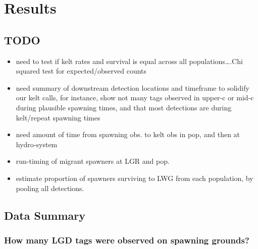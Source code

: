 \documentclass[11pt,a4paper,]{article}
\providecommand{\tightlist}{%
  \setlength{\itemsep}{0pt}\setlength{\parskip}{0pt}}
\begin{document}
\hypertarget{results}{%
\section{Results}\label{results}}

\hypertarget{todo}{%
\subsection{TODO}\label{todo}}

\begin{itemize}
\tightlist
\item
  need to test if kelt rates and survival is equal across all populations\ldots.Chi squared test for expected/observed counts
\item
  need summary of downstream detection locations and timeframe to solidify our kelt calls, for instance, show not many tags observed in upper-c or mid-c during plausible spawning times, and that most detections are during kelt/repeat spawning times
\item
  need amount of time from spawning obs. to kelt obs in pop, and then at hydro-system
\item
  run-timing of migrant spawners at LGR and pop.
\item
  estimate proportion of spawners surviving to LWG from each population, by pooling all detections.
\end{itemize}

\hypertarget{data-summary}{%
\subsection{Data Summary}\label{data-summary}}

\hypertarget{how-many-lgd-tags-were-observed-on-spawning-grounds}{%
\subsubsection{How many LGD tags were observed on spawning grounds?}\label{how-many-lgd-tags-were-observed-on-spawning-grounds}}
\end{document}
